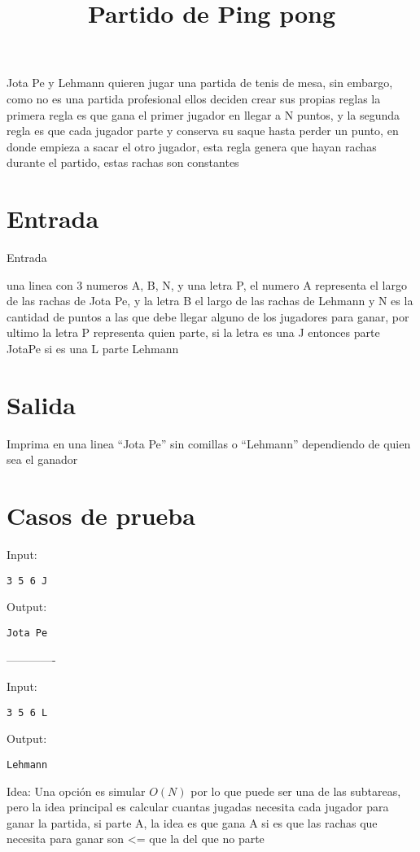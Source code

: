 \documentclass{article}
\title{Partido de Ping pong}
\begin{document}
\maketitle

Jota Pe y Lehmann quieren jugar una partida de tenis de mesa, sin embargo, como no es una partida profesional ellos deciden crear sus propias reglas
la primera regla es que gana el primer jugador en llegar a N puntos, y la segunda regla es que cada jugador parte y conserva su saque hasta perder
un punto, en donde empieza a sacar el otro jugador, esta regla genera que hayan rachas durante el partido, estas rachas son constantes

\section*{Entrada}
Entrada

una linea con 3 numeros A, B, N, y una letra P, el numero A representa el largo de las rachas de Jota Pe, y la letra B el largo de las rachas de Lehmann
y N es la cantidad de puntos a las que debe llegar alguno de los jugadores para ganar, por ultimo la letra P representa quien parte, si la letra es una J
entonces parte JotaPe si es una L parte Lehmann


\section*{Salida}

Imprima en una linea ``Jota Pe'' sin comillas o ``Lehmann'' dependiendo de quien sea el ganador

\section*{Casos de prueba}

Input:

\begin{verbatim}
3 5 6 J
\end{verbatim}

Output:

\begin{verbatim}
Jota Pe
\end{verbatim}

-------------

Input:

\begin{verbatim}
3 5 6 L
\end{verbatim}

Output:

\begin{verbatim}
Lehmann
\end{verbatim}

Idea: Una opción es simular $O(N)$ por lo que puede ser una de las subtareas, pero la idea principal es calcular cuantas jugadas necesita cada jugador
para ganar la partida, si parte A, la idea es que gana A si es que las rachas que necesita para ganar son <= que la del que no parte
\end{document}
